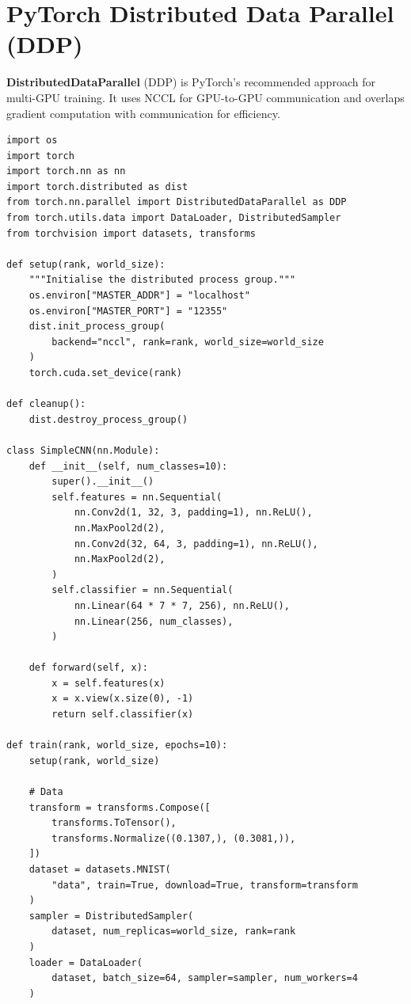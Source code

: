 \section{PyTorch Distributed Data Parallel (DDP)}
\label{sec:ddp}

\textbf{DistributedDataParallel} (DDP) is PyTorch's recommended
approach for multi-GPU training. It uses NCCL for GPU-to-GPU communication
and overlaps gradient computation with communication for efficiency.

\begin{codeblock}[title=\textbf{Complete PyTorch DDP training script}]
\begin{verbatim}
import os
import torch
import torch.nn as nn
import torch.distributed as dist
from torch.nn.parallel import DistributedDataParallel as DDP
from torch.utils.data import DataLoader, DistributedSampler
from torchvision import datasets, transforms

def setup(rank, world_size):
    """Initialise the distributed process group."""
    os.environ["MASTER_ADDR"] = "localhost"
    os.environ["MASTER_PORT"] = "12355"
    dist.init_process_group(
        backend="nccl", rank=rank, world_size=world_size
    )
    torch.cuda.set_device(rank)

def cleanup():
    dist.destroy_process_group()

class SimpleCNN(nn.Module):
    def __init__(self, num_classes=10):
        super().__init__()
        self.features = nn.Sequential(
            nn.Conv2d(1, 32, 3, padding=1), nn.ReLU(),
            nn.MaxPool2d(2),
            nn.Conv2d(32, 64, 3, padding=1), nn.ReLU(),
            nn.MaxPool2d(2),
        )
        self.classifier = nn.Sequential(
            nn.Linear(64 * 7 * 7, 256), nn.ReLU(),
            nn.Linear(256, num_classes),
        )

    def forward(self, x):
        x = self.features(x)
        x = x.view(x.size(0), -1)
        return self.classifier(x)

def train(rank, world_size, epochs=10):
    setup(rank, world_size)

    # Data
    transform = transforms.Compose([
        transforms.ToTensor(),
        transforms.Normalize((0.1307,), (0.3081,)),
    ])
    dataset = datasets.MNIST(
        "data", train=True, download=True, transform=transform
    )
    sampler = DistributedSampler(
        dataset, num_replicas=world_size, rank=rank
    )
    loader = DataLoader(
        dataset, batch_size=64, sampler=sampler, num_workers=4
    )


\end{verbatim}
\end{codeblock}
